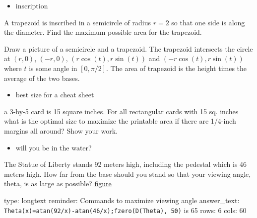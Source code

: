 \documentclass[12pt]{article}
\begin{document}
\begin{itemize}
\itemsep1pt\parskip0pt
\item
  inscription
\end{itemize}

A trapezoid is inscribed in a semicircle of radius $r=2$ so that one
side is along the diameter. Find the maximum possible area for the
trapezoid.

Draw a picture of a semicircle and a trapezoid. The trapezoid intersects
the circle at $(r,0)$, $(-r,0)$, $(r \cos(t), r\sin(t))$ and
$(-r\cos(t), r\sin(t))$ where $t$ is some angle in $[0, \pi/2]$. The
area of trapezoid is the height times the average of the two bases.


\begin{itemize}
\itemsep1pt\parskip0pt
\item
  best size for a cheat sheet
\end{itemize}

a 3-by-5 card is 15 square inches. For all rectangular cards with 15 sq.
inches what is the optimal size to maximize the printable area if there
are 1/4-inch margins all around? Show your work.


\begin{itemize}
\itemsep1pt\parskip0pt
\item
   will you be in the water?
\end{itemize}

The Statue of Liberty stands 92 meters high, including the pedestal
which is 46 meters high. How far from the base should you stand so that
your viewing angle, theta, is as large as possible?
\href{http://astro.temple.edu/~dhill001/maxmin/viewanglepic.gif}{figure}

\begin{answer}
type: longtext
reminder: Commands to maximize viewing angle
answer_text: \verb#Theta(x)=atan(92/x)-atan(46/x);fzero(D(Theta), 50)# is 65 
rows: 6
cols: 60
\end{answer}
\end{document}
